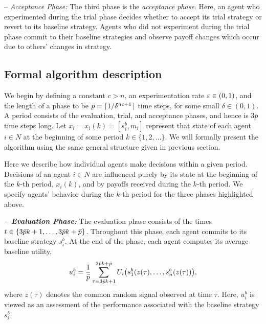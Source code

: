 \vspace{.1cm}
%
\noindent -- \emph{Acceptance Phase:} The third phase is the \emph{acceptance phase}. Here, an agent who experimented during the trial phase decides whether to accept its trial strategy or revert to its baseline strategy. Agents who did not experiment during the trial phase commit to their baseline strategies and observe payoff changes which occur due to others' changes in strategy.  


\subsection{Formal algorithm description}\label{s:algorithm}


We begin by defining a constant $c > n$, an experimentation rate $\varepsilon\in (0,1)$, and the length of a phase to be $\bar{p} = \lceil 1/\delta^{nc+1}\rceil$ time steps, for some small $\delta\in (0,1)$. A period consists of the evaluation, trial, and acceptance phases, and hence is $3\bar{p}$ time steps long. Let $x_i = x_i(k) = [s_i^b, m_i]$ represent that state of each agent $i \in N$ at the beginning of some period $k \in \{1, 2, \dots\}$.  We will formally present the algorithm using the same general structure given in previous section.  

\vspace{.2cm}

  Here we describe how individual agents make decisions within a given period.  Decisions of an agent $i \in N$ are influenced purely by its state at the beginning of the $k$-th period, $x_i(k)$, and by payoffs received during the $k$-th period.  We specify agents' behavior during the $k$-th period for the three phases highlighted above.   



\vspace{.2cm}
%
\noindent \emph{\textbf{-- Evaluation Phase:}} The evaluation phase consists of the times $t \in \{3\bar{p} k + 1, \dots, 3\bar{p} k+\bar{p}\}$.  Throughout this phase, each agent commits to its baseline strategy $s_i^b$.  At the end of the phase, each agent computes its average baseline utility, 
%
\begin{equation}\label{e:baseline payoff}
u_i^b = {1\over \bar{p}}\sum_{\tau = 3 \bar{p} k+1}^{3\bar{p} k+\bar{p}}U_i\bigl(s_1^b(z(\tau), \dots, s_n^b(z(\tau))  \bigr),
\end{equation}
%
where $z(\tau)$ denotes the common random signal observed at time $\tau$.  Here, $u_i^b$ is viewed as an assessment of the performance associated with the baseline strategy $s_i^b$.  


